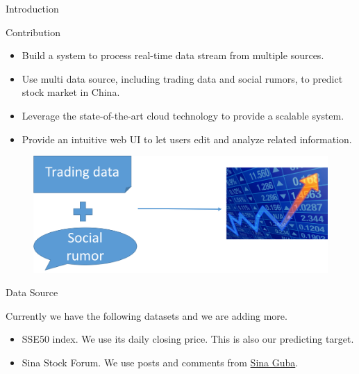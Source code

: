 \documentclass[final,hyperref={pdfpagelabels=false}]{beamer}
\begin{document}
\begin{frame}[t]
\begin{columns}[t]
\begin{column}{.445\textwidth}
\begin{block}{Introduction}
\begin{itemize}
\end{itemize}
\end{block}


\begin{block}{Contribution}

\begin{itemize}
\item Build a system to process real-time data stream from multiple sources. 
\item Use multi data source, including trading data and social rumors, to predict stock market in China.
\item Leverage the state-of-the-art cloud technology to provide a scalable system. 
\item Provide an intuitive web UI to let users edit and analyze related information.
\end{itemize}
\centering
\begin{figure}
\includegraphics[width=0.5\linewidth]{intuition.png}
\label{sample}
\end{figure}

\end{block}


\begin{block}{Data Source}



Currently we have the following datasets and we are adding more. 
\begin{itemize}
\item SSE50 index. We use its daily closing price. This is also our predicting target.
\item Sina Stock Forum. We use posts and comments from \href{http://guba.sina.com.cn}{Sina Guba}.


\end{itemize}
\end{block}
\end{column}
\end{columns}
\end{frame}
\end{document}
